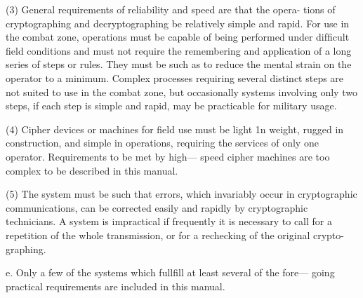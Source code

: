 (3) General requirements of reliability and speed are that the opera-
tions of cryptographing and decryptographing be relatively
simple and rapid. For use in the combat zone, operations must
be capable of being performed under difﬁcult ﬁeld conditions
and must not require the remembering and application of a
long series of steps or rules. They must be such as to reduce
the mental strain on the operator to a minimum. Complex
processes requiring several distinct steps are not suited to use
in the combat zone, but occasionally systems involving only
two steps, if each step is simple and rapid, may be practicable
for military usage.

(4) Cipher devices or machines for ﬁeld use must be light 1n weight,
rugged in construction, and simple in operations, requiring the
services of only one operator. Requirements to be met by high—
speed cipher machines are too complex to be described in this
manual.

(5) The system must be such that errors, which invariably occur in
cryptographic communications, can be corrected easily and
rapidly by cryptographic technicians. A system is impractical
if frequently it is necessary to call for a repetition of the whole
transmission, or for a rechecking of the original crypto-
graphing.

e. Only a few of the systems which fullfill at least several of the fore—
going practical requirements are included in this manual.
